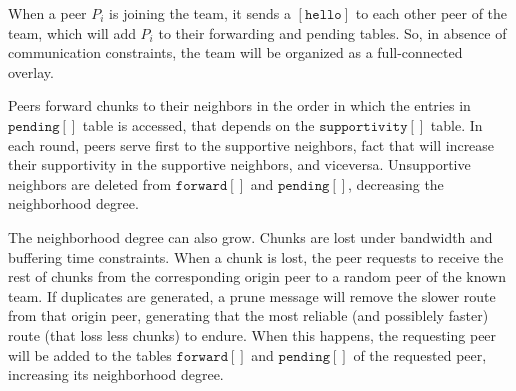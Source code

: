 When a peer $P_i$ is joining the team, it sends a $[\mathtt{hello}]$
to each other peer of the team, which will add $P_i$ to their
forwarding and pending tables. So, in absence of communication
constraints, the team will be organized as a full-connected overlay.

Peers forward chunks to their neighbors in the order in which the
entries in $\mathtt{pending}[]$ table is accessed, that depends on the
$\mathtt{supportivity}[]$ table. In each round, peers serve first to
the supportive neighbors, fact that will increase their supportivity
in the supportive neighbors, and viceversa. Unsupportive neighbors are
deleted from $\mathtt{forward}[]$ and $\mathtt{pending}[]$, decreasing
the neighborhood degree.

The neighborhood degree can also grow. Chunks are lost under bandwidth
and buffering time constraints. When a chunk is lost, the peer
requests to receive the rest of chunks from the corresponding origin
peer to a random peer of the known team. If duplicates are generated,
a prune message will remove the slower route from that origin peer,
generating that the most reliable (and possiblely faster) route (that
loss less chunks) to endure. When this happens, the requesting peer
will be added to the tables $\mathtt{forward}[]$ and
$\mathtt{pending}[]$ of the requested peer, increasing its
neighborhood degree.

